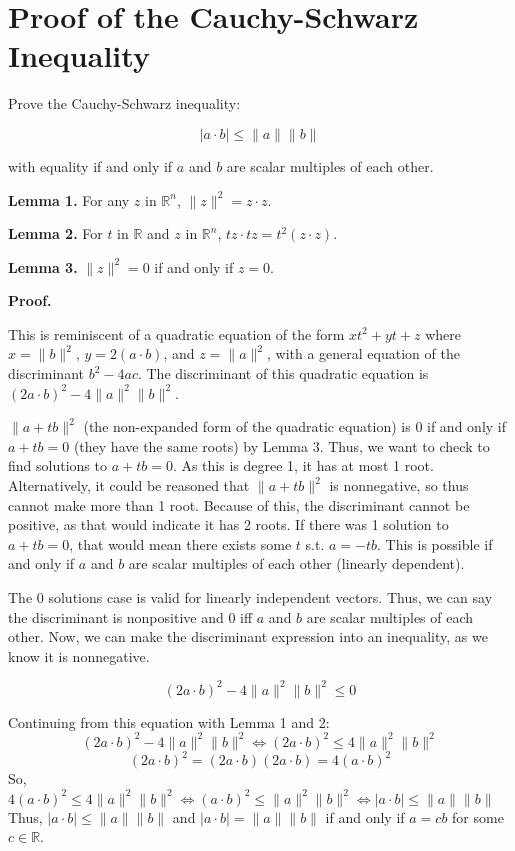 \documentclass[11pt]{article}
\begin{document}
\section*{Proof of the Cauchy-Schwarz Inequality}

Prove the Cauchy-Schwarz inequality:

\[
|a\cdot b| \leq \|a\|\|b\|
\]

with equality if and only if $a$ and $b$ are scalar multiples of each other.

\textbf{Lemma 1.} For any $z$ in $\mathbb{R}^n$, $\|z\|^2 = z\cdot z$.

\textbf{Lemma 2.} For $t$ in $\mathbb{R}$ and $z$ in $\mathbb{R}^n$, $tz\cdot tz = t^2(z\cdot z)$.

\textbf{Lemma 3.} $\|z\|^2 = 0$ if and only if $z = 0$.

\textbf{Proof.}

This is reminiscent of a quadratic equation of the form $xt^2 + yt + z$ where $x = \|b\|^2$, $y = 2(a\cdot b)$, and $z = \|a\|^2$, with a general equation of the discriminant $b^2 - 4ac$. The discriminant of this quadratic equation is $(2a\cdot b)^2 - 4\|a\|^2\|b\|^2$.

$\|a+tb\|^2$ (the non-expanded form of the quadratic equation) is $0$ if and only if $a+tb = 0$ (they have the same roots) by Lemma 3. Thus, we want to check to find solutions to $a+tb = 0$. As this is degree 1, it has at most 1 root. Alternatively, it could be reasoned that $\|a+tb\|^2$ is nonnegative, so thus cannot make more than 1 root. Because of this, the discriminant cannot be positive, as that would indicate it has 2 roots. If there was 1 solution to $a+tb=0$, that would mean there exists some $t$ s.t. $a=-tb$. This is possible if and only if $a$ and $b$ are scalar multiples of each other (linearly dependent).

The $0$ solutions case is valid for linearly independent vectors. Thus, we can say the discriminant is nonpositive and $0$ iff $a$ and $b$ are scalar multiples of each other. Now, we can make the discriminant expression into an inequality, as we know it is nonnegative.

\[
(2a\cdot b)^2 - 4\|a\|^2\|b\|^2 \leq 0
\]

Continuing from this equation with Lemma 1 and 2:
\[(2a \cdot b)^2 - 4\lVert a \rVert^2 \lVert b \rVert^2 \Longleftrightarrow (2a \cdot b)^2 \leq 4\lVert a \rVert^2 \lVert b \rVert^2 \]
\[(2a \cdot b)^2 = (2a \cdot b)(2a \cdot b) = 4(a \cdot b)^2 \]
So, \( 4(a \cdot b)^2 \leq 4\lVert a \rVert^2 \lVert b \rVert^2 \Longleftrightarrow (a \cdot b)^2 \leq \lVert a \rVert^2 \lVert b \rVert^2 \Longleftrightarrow |a \cdot b| \leq \lVert a \rVert \lVert b \rVert \)
Thus, \( |a \cdot b| \leq \lVert a \rVert \lVert b \rVert \) and \( |a \cdot b| = \lVert a \rVert \lVert b \rVert \) if and only if \( a = cb \) for some \( c \in \mathbb{R} \).
\end{document}
